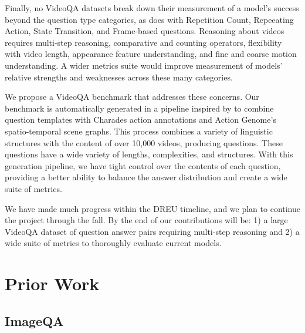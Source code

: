 \documentclass[10pt,twocolumn,letterpaper]{article}
\newcommand{\mgm}[1]{{\color{cyan}{mgm: #1}}}
\begin{document}
\mgm{Is this a useful thing to include: Few questions in existing benchmarks focus specifically on object manipulation through videos.} 

Finally, no VideoQA datasets break down their measurement of a model's success beyond the question type categories, as \cite{jang2017tgif} does with Repetition Count, Repeeating Action, State Transition, and Frame-based questions. Reasoning about videos requires multi-step reasoning, comparative and counting operators, flexibility with video length, appearance feature understanding, and fine and coarse motion understanding. A wider metrics suite would improve measurement of models' relative strengths and weaknesses across these many categories.

We propose a VideoQA benchmark that addresses these concerns. Our benchmark is automatically generated in a pipeline inspired by \cite{hudson2019gqa} to combine question templates with Charades action annotations and Action Genome's spatio-temporal scene graphs. This process combines a variety of linguistic structures with the content of over 10,000 videos, producing \mgm{add here} questions. These questions have a wide variety of lengths, complexities, and structures. With this generation pipeline, we have tight control over the contents of each question, providing a better ability to balance the answer distribution and create a wide suite of metrics.

We have made much progress within the DREU timeline, and we plan to continue the project through the fall. By the end of our contributions will be: 1) a large VideoQA dataset of question answer pairs requiring multi-step reasoning and 2) a wide suite of metrics to thoroughly evaluate current models.

\section{Prior Work}

\subsection{ImageQA}
\end{document}
